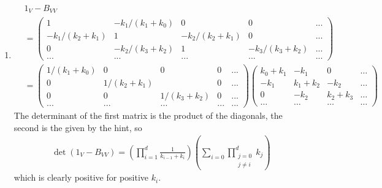\begin{enumerate}[label=11.\arabic*]
\begin{ungradedsolution}
\begin{enumerate}
			\item
			\begin{align*}
				 & 1_V-B_{VV}                                                                       \\
				 & =\begin{pmatrix}
					    1                & -k_1/(k_1+k_0)   & 0                & 0                & ... \\
					    -k_1 / (k_2+k_1) & 1                & -k_2 / (k_2+k_1) & 0                & ... \\
					    0                & -k_2 / (k_3+k_2) & 1                & -k_3 / (k_3+k_2) & ... \\
					    ...              & ...              & ...              & ...              & ...
				    \end{pmatrix} \\
				 & =\begin{pmatrix}
					    1/(k_1+k_0) & 0            & 0             & 0   & ... \\
					    0           & 1/ (k_2+k_1) &               & 0   & ... \\
					    0           & 0            & 1 / (k_3+k_2) & 0   & ... \\
					    ...         & ...          & ...           & ... & ...
				    \end{pmatrix}
				\begin{pmatrix}
					k_0+k_1 & -k_1      & 0         & \dots \\
					-k_1    & k_1 + k_2 & -k_2      & \dots \\
					0       & -k_2      & k_2 + k_3 & \dots \\
					\dots   & \dots     & \dots     & \dots
				\end{pmatrix}
			\end{align*}
			The determinant of the first matrix is the product of the diagonals, the second is the given by the hint, so
			\begin{align*}
				\det (1_V - B_{VV}) = \left(\prod_{i=1}^d \frac{1}{k_{i-1}+k_i}\right)\left(\sum_{i=0}\prod_{\substack{j = 0 \\j\neq i}}^d k_j\right)
			\end{align*}
			which is clearly positive for positive $k_i$.


\end{enumerate}
\end{ungradedsolution}
\end{enumerate}
